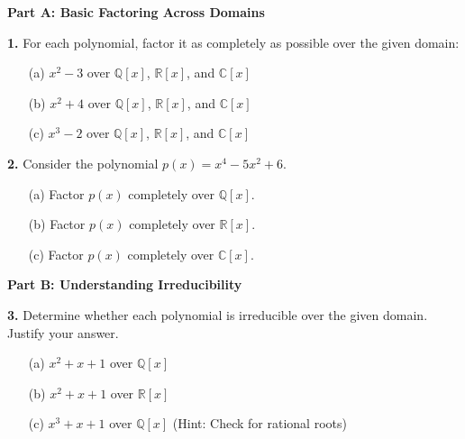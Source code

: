 \documentclass[12pt]{article}
\begin{document}
\textbf{Part A: Basic Factoring Across Domains}

\textbf{1.} For each polynomial, factor it as completely as possible over the given domain:

\begin{enumerate}
\item[(a)] $x^2 - 3$ over $\mathbb{Q}[x]$, $\mathbb{R}[x]$, and $\mathbb{C}[x]$
\vspace{2cm}

\item[(b)] $x^2 + 4$ over $\mathbb{Q}[x]$, $\mathbb{R}[x]$, and $\mathbb{C}[x]$  
\vspace{2cm}

\item[(c)] $x^3 - 2$ over $\mathbb{Q}[x]$, $\mathbb{R}[x]$, and $\mathbb{C}[x]$
\vspace{2cm}
\end{enumerate}

\textbf{2.} Consider the polynomial $p(x) = x^4 - 5x^2 + 6$.

\begin{enumerate}
\item[(a)] Factor $p(x)$ completely over $\mathbb{Q}[x]$.
\vspace{2cm}

\item[(b)] Factor $p(x)$ completely over $\mathbb{R}[x]$.
\vspace{2cm}

\item[(c)] Factor $p(x)$ completely over $\mathbb{C}[x]$.
\vspace{2cm}
\end{enumerate}

\textbf{Part B: Understanding Irreducibility}

\textbf{3.} Determine whether each polynomial is irreducible over the given domain. Justify your answer.

\begin{enumerate}
\item[(a)] $x^2 + x + 1$ over $\mathbb{Q}[x]$
\vspace{2cm}

\item[(b)] $x^2 + x + 1$ over $\mathbb{R}[x]$
\vspace{2cm}

\item[(c)] $x^3 + x + 1$ over $\mathbb{Q}[x]$ (Hint: Check for rational roots)
\vspace{2cm}
\end{enumerate}
\end{document}
